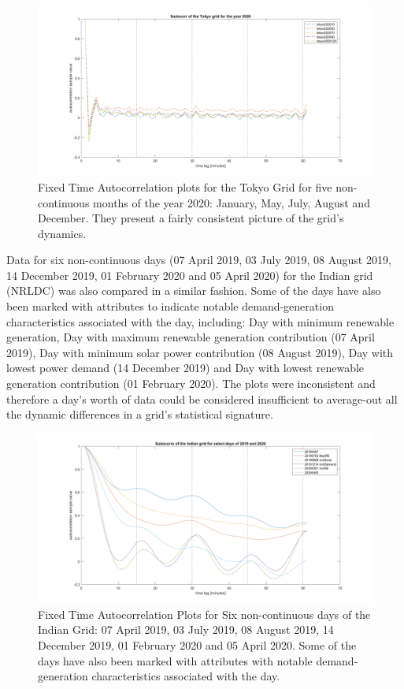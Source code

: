 \begin{figure}[!ht]
	\includegraphics[scale=0.25]{../figures/autocorr/fautocorrs_tokyo_202001_to_202012}
	\caption{Fixed Time Autocorrelation plots for the Tokyo Grid for five non-continuous months of the year 2020: January, May, July, August and December. They present a fairly consistent picture of the grid's dynamics.}
\end{figure}

Data for six non-continuous days (07 April 2019, 03 July 2019, 08 August 2019, 14 December 2019, 01 February 2020 and 05 April 2020) for the Indian grid (NRLDC) was also compared in a similar fashion. Some of the days have also been marked with attributes to indicate notable demand-generation characteristics associated with the day, including: Day with minimum renewable generation, Day with maximum renewable generation contribution (07 April 2019), Day with minimum solar power contribution (08 August 2019), Day with lowest power demand (14 December 2019) and Day with lowest renewable generation contribution (01 February 2020). The plots were inconsistent and therefore a day's worth of data could be considered insufficient to average-out all the dynamic differences in a grid's statistical signature.

\begin{figure}[!ht]
	\includegraphics[scale=0.25]{../figures/autocorr/fautocorrs_nrldc_201904_to_202004}
	\caption{Fixed Time Autocorrelation Plots for Six non-continuous days of the Indian Grid: 07 April 2019, 03 July 2019, 08 August 2019, 14 December 2019, 01 February 2020 and 05 April 2020. Some of the days have also been marked with attributes with notable demand-generation characteristics associated with the day.}
\end{figure}

